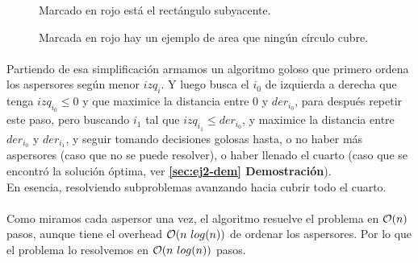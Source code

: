 \documentclass[./main.tex]{subfiles}
\begin{document}
\begin{figure}[H]
\centering


\caption{Marcado en rojo está el rectángulo subyacente.}
\label{fig:ej2-simple-sprinkle}
\end{figure}

\begin{figure}[H]
\centering


\caption{Marcada en rojo hay un ejemplo de area que ningún círculo cubre.}
\label{fig:ej2-two-sprinklers}
\end{figure}

\paragraph{} Partiendo de esa simplificación armamos un algoritmo goloso que primero ordena los aspersores según menor \(izq_i\). Y luego busca el \(i_0\) de izquierda a derecha que tenga \(izq_{i_0} \leq 0\) y que maximice la distancia entre 0 y \(der_{i_0}\), para después repetir este paso, pero buscando \(i_1\) tal que \(izq_{i_1} \leq der_{i_0}\), y maximice la distancia entre \(der_{i_0}\) y \(der_{i_1}\), y seguir tomando decisiones golosas hasta, o no haber más aspersores (caso que no se puede resolver), o haber llenado el cuarto (caso que se encontró la solución óptima, ver \textbf{\ref{sec:ej2-dem} Demostración}). \\
En esencia, resolviendo subproblemas avanzando hacia cubrir todo el cuarto.

\paragraph{} Como miramos cada aspersor una vez, el algoritmo resuelve el problema en \(\mathcal{O}(n)\) pasos, aunque tiene el overhead \(\mathcal{O}(n\ log(n))\) de ordenar los aspersores. Por lo que el problema lo resolvemos en \(\mathcal{O}(n\ log(n))\) pasos.
\end{document}
